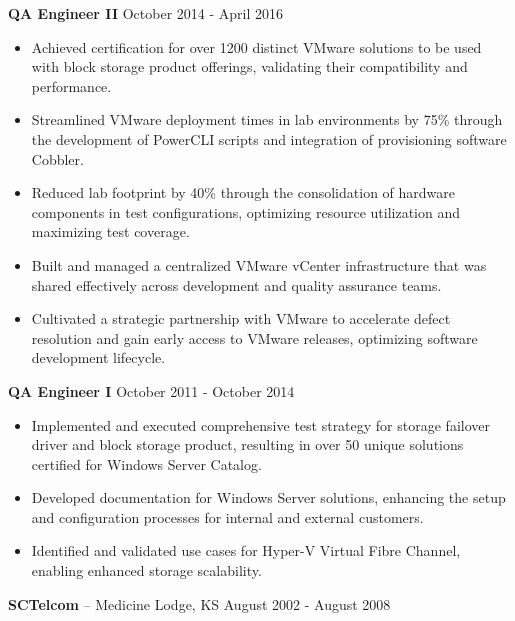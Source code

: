 \documentclass[11pt]{article}       %
\begin{document}
\textbf{QA Engineer II} \hfill October 2014 - April 2016 \\
\vspace{-9pt}
\begin{itemize}
  \item Achieved certification for over 1200 distinct VMware solutions to be used with block storage product offerings, validating their compatibility and performance.
  \item Streamlined VMware deployment times in lab environments by 75\% through the development of PowerCLI scripts and integration of provisioning software Cobbler.
  \item Reduced lab footprint by 40\% through the consolidation of hardware components in test configurations, optimizing resource utilization and maximizing test coverage.
  \item Built and managed a centralized VMware vCenter infrastructure that was shared effectively across development and quality assurance teams.
  \item Cultivated a strategic partnership with VMware to accelerate defect resolution and gain early access to VMware releases, optimizing software development lifecycle.
\end{itemize}

\textbf{QA Engineer I} \hfill October 2011 - October 2014 \\
\vspace{-9pt}
\begin{itemize}
  \item Implemented and executed comprehensive test strategy for storage failover driver and block storage product, resulting in over 50 unique solutions certified for Windows Server Catalog.
  \item Developed documentation for Windows Server solutions, enhancing the setup and configuration processes for internal and external customers.
  \item Identified and validated use cases for Hyper-V Virtual Fibre Channel, enabling enhanced storage scalability.
\end{itemize}

\textbf{SCTelcom} -- Medicine Lodge, KS \hfill August 2002 - August 2008 \\
\end{document}
